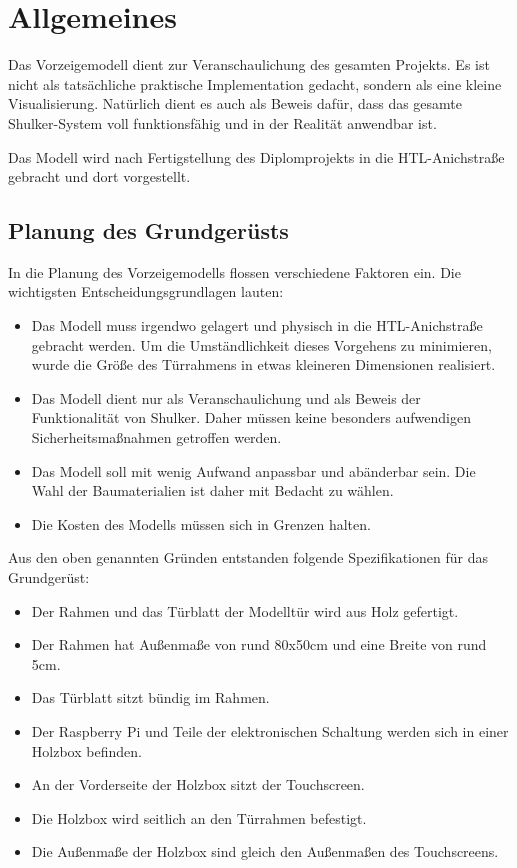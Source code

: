 \chapter{Allgemeines}
Das Vorzeigemodell dient zur Veranschaulichung des gesamten Projekts. Es ist nicht als tatsächliche
praktische Implementation gedacht, sondern als eine kleine Visualisierung. Natürlich dient es auch als Beweis dafür,
dass das gesamte Shulker-System voll funktionsfähig und in der Realität anwendbar ist.

Das Modell wird nach Fertigstellung des Diplomprojekts in die HTL-Anichstraße gebracht und dort vorgestellt.

\section{Planung des Grundgerüsts}
In die Planung des Vorzeigemodells flossen verschiedene Faktoren ein. Die wichtigsten Entscheidungsgrundlagen lauten:

\begin{itemize}
    \item Das Modell muss irgendwo gelagert und physisch in die HTL-Anichstraße gebracht werden. Um die Umständlichkeit
    dieses Vorgehens zu minimieren, wurde die Größe des Türrahmens in etwas kleineren Dimensionen realisiert.

    \item Das Modell dient nur als Veranschaulichung und als Beweis der Funktionalität von Shulker. Daher müssen keine besonders aufwendigen
    Sicherheitsmaßnahmen getroffen werden.

    \item Das Modell soll mit wenig Aufwand anpassbar und abänderbar sein. Die Wahl der Baumaterialien ist daher mit Bedacht
    zu wählen.

    \item Die Kosten des Modells müssen sich in Grenzen halten.
\end{itemize}

Aus den oben genannten Gründen entstanden folgende Spezifikationen für das Grundgerüst:

\begin{itemize}
    \item Der Rahmen und das Türblatt der Modelltür wird aus Holz gefertigt.
    \item Der Rahmen hat Außenmaße von rund 80x50cm und eine Breite von rund 5cm.
    \item Das Türblatt sitzt bündig im Rahmen.
    \item Der Raspberry Pi und Teile der elektronischen Schaltung werden sich in einer Holzbox befinden.
    \item An der Vorderseite der Holzbox sitzt der Touchscreen.
    \item Die Holzbox wird seitlich an den Türrahmen befestigt.
    \item Die Außenmaße der Holzbox sind gleich den Außenmaßen des Touchscreens.
\end{itemize}

